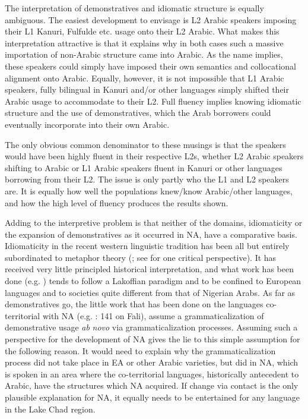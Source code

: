 \documentclass[output=paper]{langsci/langscibook}
\begin{document}
The interpretation of demonstratives and idiomatic structure is equally ambiguous. The easiest development to envisage is L2 Arabic speakers imposing their L1 Kanuri, Fulfulde etc. usage onto their L2 Arabic. What makes this interpretation attractive is that it explains why in both cases such a massive importation of non-Arabic structure came into Arabic. As the name implies, these speakers could simply have imposed their own semantics and collocational alignment onto Arabic. Equally, however, it is not impossible that L1 Arabic speakers, fully bilingual in Kanuri and/or other languages simply shifted their Arabic usage to accommodate to their L2. Full fluency implies knowing idiomatic structure and the use of demonstratives, which the Arab borrowers could eventually incorporate into their own Arabic.

The only obvious common denominator to these musings is that the speakers would have been highly fluent in their respective L2s, whether L2 Arabic speakers shifting to Arabic or L1 Arabic speakers fluent in Kanuri or other languages borrowing from their L2. The issue is only partly who the L1 and L2 speakers are. It is equally how well the populations knew/know Arabic/other languages, and how the high level of fluency produces the results shown.

Adding to the interpretive problem is that neither of the domains, idiomaticity or the expansion of demonstratives as it occurred in NA, have a comparative basis. Idiomaticity in the recent western linguistic tradition has been all but entirely subordinated to metaphor theory (\citealt{LakoffJohnson1999}; see \citealt{Haser2005} for one critical perspective). It has received very little principled historical interpretation, and what work has been done (e.g. \citealt{Sweetser1990}) tends to follow a Lakoffian paradigm and to be confined to European languages and to societies quite different from that of Nigerian Arabs. As far as demonstratives go, the little work that has been done on the languages co-territorial with NA (e.g. \citealt{Kramer2014}: 141 on Fali), assume a grammaticalization of demonstrative usage \textit{ab} \textit{novo} via grammaticalization processes. Assuming such a perspective for the development of NA gives the lie to this simple assumption for the following reason. It would need to explain why the grammaticalization process did not take place in EA or other Arabic varieties, but did in NA, which is spoken in an area where the co-territorial languages, historically antecedent to Arabic, have the structures which NA acquired. If change via contact is the only plausible explanation for NA, it equally needs to be entertained for any language in the Lake Chad region.
\end{document}
